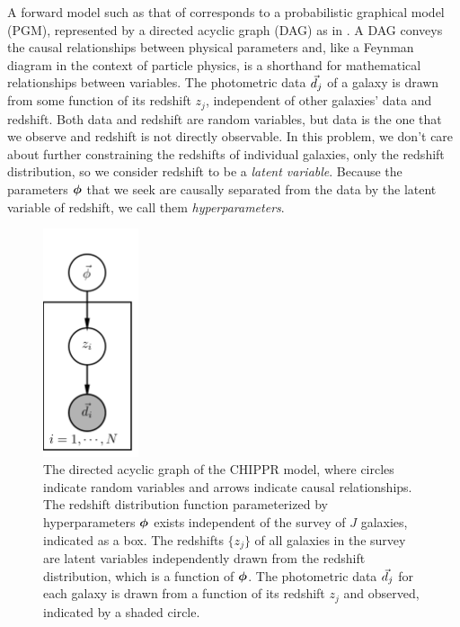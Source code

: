 A forward model such as that of  corresponds to a probabilistic graphical model (PGM), represented by a directed acyclic graph (DAG) as in .
A DAG conveys the causal relationships between physical parameters and, like a Feynman diagram in the context of particle physics, is a shorthand for mathematical relationships between variables.
The photometric data $\vec{d}_{j}$ of a galaxy is drawn from some function of its redshift $z_{j}$, independent of other galaxies' data and redshift.
Both data and redshift are random variables, but data is the one that we observe and redshift is not directly observable.
In this problem, we don't care about further constraining the redshifts of individual galaxies, only the redshift distribution, so we consider redshift to be a \textit{latent variable}.
Because the parameters ${\boldsymbol{\phi}}$ that we seek are causally separated from the data by the latent variable of redshift, we call them \textit{hyperparameters}.

\begin{figure}
	\begin{center}
		\includegraphics[width=0.25\textwidth]{figures/chippr/pgm.png}
		\caption{The directed acyclic graph of the CHIPPR model, where circles indicate random variables and arrows indicate causal relationships.
			The redshift distribution function parameterized by hyperparameters ${\boldsymbol{\phi}}$ exists independent of the survey of $J$ galaxies, indicated as a box.  
			The redshifts $\{z_{j}\}$ of all galaxies in the survey are latent variables independently drawn from the redshift distribution, which is a function of ${\boldsymbol{\phi}}$. 
			The photometric data $\vec{d}_{j}$ for each galaxy is drawn from a function of its redshift $z_{j}$ and observed, indicated by a shaded circle.}
	\end{center}
\end{figure}

